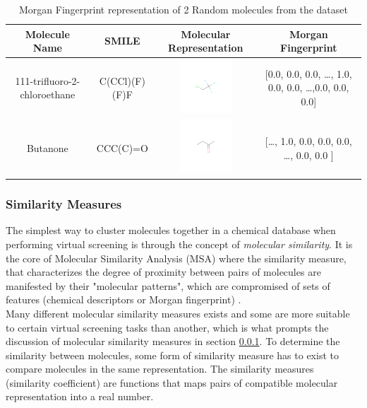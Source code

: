 \documentclass[a4paper,12pt]{report}
\begin{document}
					\begin{table}[ht!]
						\centering
						\begin{tabular}{ | c | c | c | c |   }
							\hline
							Molecule Name & SMILE & Molecular Representation & Morgan Fingerprint \\
							\hline
							111-trifluoro-2-chloroethane & C(CCl)(F)(F)F & \includegraphics[width=2cm,height=2cm]{images/111-trifluoro-2-chloroethane.png} & [0.0, 0.0, 0.0, \ldots, 1.0, 0.0, 0.0, \ldots ,0.0, 0.0, 0.0] \\
							\hline
							Butanone & CCC(C)=O & \includegraphics[width=2cm,height=2cm]{images/Butanone.png} & [\ldots, 1.0, 0.0, 0.0, 0.0, \ldots, 0.0, 0.0 ] \\
							\hline
						\end{tabular}
						\caption{Morgan Fingerprint representation of 2 Random molecules from the dataset}
						\label{table:random_morgan_fingerprint}
					\end{table} 
			\subsubsection{Similarity Measures} 
			\label{subsubsection_similarity_measures}
			The simplest way to cluster molecules together in a chemical database when performing virtual screening is through the concept of \textit{molecular similarity}. It is the core of Molecular Similarity Analysis (MSA) where the similarity measure, that characterizes the degree of proximity between pairs of molecules are manifested by their "molecular patterns", which are compromised of sets of features (chemical descriptors or Morgan fingerprint) \cite{Jurgen2004}. \\
			Many different molecular similarity measures exists and some are more suitable to certain virtual screening tasks than another, which is what prompts the discussion of molecular similarity measures in section \ref{subsubsection_similarity_measures}. 
			To determine the similarity between molecules, some form of similarity measure has to exist to compare molecules in the same representation. The similarity measures (similarity coefficient) are functions that maps pairs of compatible molecular representation into a real number. 
			
\end{document}
